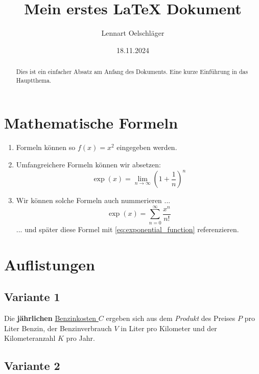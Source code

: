\documentclass{article}
\title{Mein erstes LaTeX Dokument}
\author{Lennart Oelschläger}
\date{18.11.2024}
\begin{document}
\maketitle

\begin{abstract}
    Dies ist ein einfacher Absatz am Anfang des Dokuments. Eine kurze Einführung in das Hauptthema.
\end{abstract}

\tableofcontents

\newpage

\section{Mathematische Formeln}

\begin{enumerate}
    \item Formeln können so $f(x) = x^2$ eingegeben werden. 
    \item Umfangreichere Formeln können wir absetzen:
    $$ \exp(x) =  \lim_{n \to \infty} \left( 1 + \frac{1}{n} \right)^n $$
    \item Wir können solche Formeln auch nummerieren ...
    \begin{equation}
        \label{eq:exponential_function}
        \exp(x) = \sum_{n = 0}^\infty \frac{x^n}{n!}
    \end{equation}
    ... und später diese Formel mit \eqref{eq:exponential_function} referenzieren.
\end{enumerate}

\section{Auflistungen}

\subsection{Variante 1}

Die \textbf{jährlichen} \underline{Benzinkosten $C$} ergeben sich aus dem \textit{Produkt} des Preises $P$ pro Liter Benzin, der Benzinverbrauch $V$ in Liter pro Kilometer und der Kilometeranzahl $K$ pro Jahr.

\subsection{Variante 2}
\end{document}
